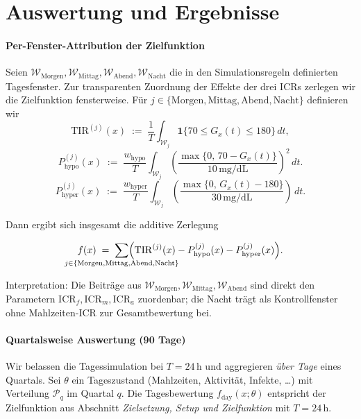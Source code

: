 \documentclass[ngerman,a4paper,12pt,pdftex]{article}
\newcommand{\Ind}{\mathbf{1}}
\newcommand{\Hhypo}{10\,\mathrm{mg/dL}}
\newcommand{\Hhyper}{30\,\mathrm{mg/dL}}
\newcommand{\ICRf}{\mathrm{ICR}_f}
\newcommand{\ICRm}{\mathrm{ICR}_m}
\newcommand{\ICRa}{\mathrm{ICR}_a}
\begin{document}
\section{Auswertung und Ergebnisse}

\paragraph{Per-Fenster-Attribution der Zielfunktion}
Seien \(\mathcal W_{\mathrm{Morgen}}, \mathcal W_{\mathrm{Mittag}}, \mathcal W_{\mathrm{Abend}}, \mathcal W_{\mathrm{Nacht}}\) die in den Simulationsregeln definierten Tagesfenster. Zur transparenten Zuordnung der Effekte der drei ICRs zerlegen wir die Zielfunktion fensterweise. Für \(j\in\{\mathrm{Morgen},\mathrm{Mittag},\mathrm{Abend},\mathrm{Nacht}\}\) definieren wir
\[
\mathrm{TIR}^{(j)}(x)\;:=\;\frac{1}{T}\int_{\mathcal W_j} \Ind\{70\le G_x(t)\le 180\}\,dt,
\]
\[
P_{\mathrm{hypo}}^{(j)}(x)\;:=\;\frac{w_{\mathrm{hypo}}}{T}\int_{\mathcal W_j}\!\left(\frac{\max\{0,\,70-G_x(t)\}}{\Hhypo}\right)^{\!2}\, dt.
\]
\[
P_{\mathrm{hyper}}^{(j)}(x)\;:=\;\frac{w_{\mathrm{hyper}}}{T}\int_{\mathcal W_j}\!\left(\frac{\max\{0,\,G_x(t)-180\}}{\Hhyper}\right)\, dt.
\]
\medskip

\noindent Dann ergibt sich insgesamt die additive Zerlegung

\newcommand{\Jfen}{\{\mathrm{Morgen},\mathrm{Mittag},\mathrm{Abend},\mathrm{Nacht}\}}
\[
f(x) \;=\; \sum_{\mathclap{j\in\Jfen}}\Bigl(\mathrm{TIR}^{(j)}(x) - P_{\mathrm{hypo}}^{(j)}(x) - P_{\mathrm{hyper}}^{(j)}(x)\Bigr).
\]
\medskip

\noindent Interpretation: Die Beiträge aus \(\mathcal W_{\mathrm{Morgen}},\mathcal W_{\mathrm{Mittag}},\mathcal W_{\mathrm{Abend}}\) sind direkt den Parametern \(\ICRf,\ICRm,\ICRa\) zuordenbar; die Nacht trägt als Kontrollfenster ohne Mahlzeiten-ICR zur Gesamtbewertung bei.
\medskip
\paragraph{Quartalsweise Auswertung (90 Tage)}
Wir belassen die Tagessimulation bei \(T=24\,\mathrm{h}\) und aggregieren \emph{über Tage} eines Quartals. Sei \(\theta\) ein Tageszustand (Mahlzeiten, Aktivität, Infekte, \ldots) mit Verteilung \(\mathcal P_q\) im Quartal \(q\). Die Tagesbewertung \(f_{\text{day}}(x;\theta)\) entspricht der Zielfunktion aus Abschnitt \emph{Zielsetzung, Setup und Zielfunktion} mit \(T=24\,\mathrm{h}\).
\end{document}

